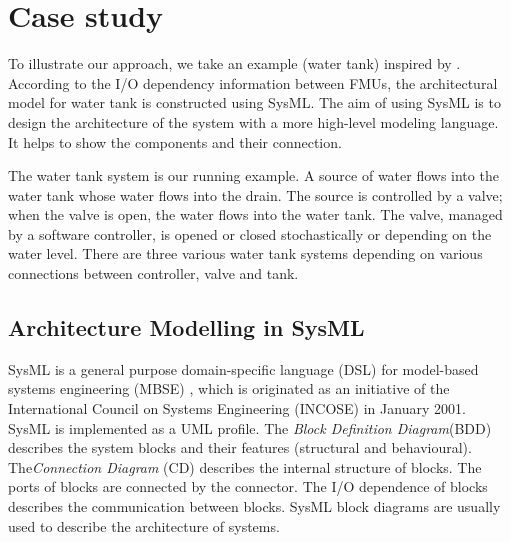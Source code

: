 
\section{Case study}
\label{sec:sysml}
To illustrate our approach, we take an example (water tank) inspired by \cite{AmalioPCW16}. According to the I/O dependency information between FMUs, the architectural model for water tank is constructed using SysML. The aim of using SysML is to design the architecture of the system with a more high-level modeling language. It helps to show the components and their connection.

The water tank system is our running example. A source of water flows into the water tank whose water flows into the drain. The source is controlled by a valve; when the valve is open, the water flows into the water tank. The valve, managed by a software controller, is opened or closed stochastically or depending on the water level. There are three various water tank systems depending on various connections between controller, valve and tank. 

\subsection{Architecture Modelling in SysML}
SysML is a general purpose domain-specific language (DSL) \cite{SemerathBHSV17} for model-based systems engineering (MBSE) \cite{Dori16}, which is originated as an initiative of the International Council on Systems Engineering (INCOSE) \cite{Pepper2015International} in January 2001. SysML is implemented as a UML profile. The \textit{Block Definition Diagram}(BDD) describes the system blocks and their features (structural and behavioural). The\textit{Connection Diagram} (CD) describes the internal structure of blocks. The ports of blocks are connected by the connector. The I/O dependence of blocks describes the communication between blocks. SysML block diagrams are usually used to describe the architecture of systems.

